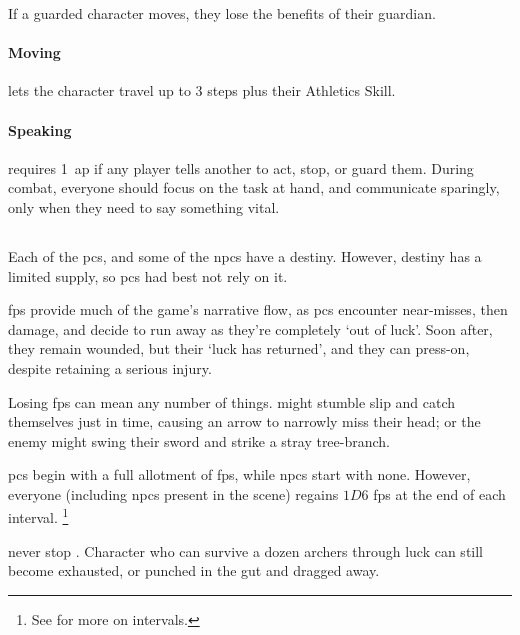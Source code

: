 \begin{multicols}{2}
If a guarded character moves, they lose the benefits of their guardian.

\paragraph{Moving}
\label{moving}
lets the character travel up to 3 steps plus their Athletics Skill.

\paragraph{Speaking}
requires 1~\gls{ap} if any player tells another to act, stop, or guard them.
During combat, everyone should focus on the task at hand, and communicate sparingly, only when they need to say something vital.

\subsection{}
\label{fate_points}

\noindent
Each of the \glspl{pc}, and some of the \glspl{npc} have a destiny.
However, destiny has a limited supply, so \glspl{pc} had best not rely on it.



\Glspl{fp} provide much of the game's narrative flow, as \glspl{pc} encounter near-misses, then damage, and decide to run away as they're completely `out of luck'.
Soon after, they remain wounded, but their `luck has returned', and they can press-on, despite retaining a serious injury.

Losing \glspl{fp} can mean any number of things.
 might stumble slip and catch themselves just in time, causing an arrow to narrowly miss their head; or the enemy might swing their sword and strike a stray tree-branch.

\Glspl{pc} begin with a full allotment of \glspl{fp}, while \glspl{npc} start with none.
However, everyone (including \glspl{npc} present in the scene) regains $1D6$ \glspl{fp} at the end of each \gls{interval}.%
\footnote{See  for more on \glspl{interval}.}

 never stop .
Character who can survive a dozen archers through luck can still become exhausted, or punched in the gut and dragged away.

\end{multicols}

